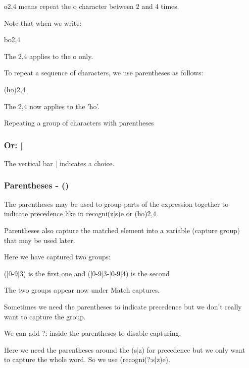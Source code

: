 \documentclass{article}
\begin{document}
o{2,4} means repeat the o character between 2 and 4 times.

Note that when we write:

bo{2,4}

The {2,4} applies to the o only.

To repeat a sequence of characters, we use parentheses as follows:

(ho){2,4}

The {2,4} now applies to the 'ho'.

Repeating a group of characters with parentheses

\subsubsection{Or: |}

The vertical bar | indicates a choice.  

\subsubsection{Parentheses - ()}
The parentheses may be used to group parts of the expression together to indicate precedence like in recogni(z|s)e or (ho){2,4}.

Parentheses also capture the matched element into a variable (capture group) that may be used later.

Here we have captured two groups: 

([0-9]{3}) is the first one and  ([0-9]{3}-[0-9]{4}) is the second

The two groups appear now under Match captures.

Sometimes we need the parentheses to indicate precedence but we don’t really want to capture the group.

We can add ?: inside the parentheses to disable capturing.

Here we need the parentheses around the (s|z) for precedence but we only want to capture the whole word.  So we use (recogni(?:s|z)e).
\end{document}
